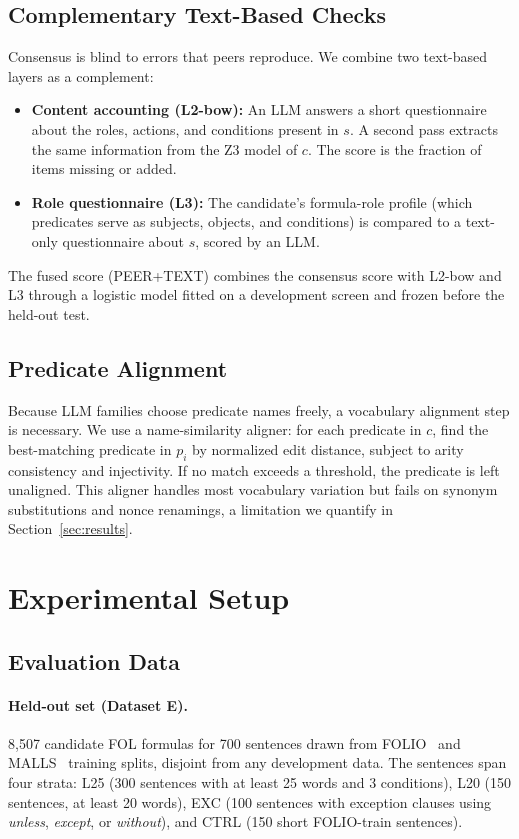 \documentclass[11pt,letterpaper]{article}
\begin{document}
\subsection{Complementary Text-Based Checks}

Consensus is blind to errors that peers reproduce. We combine two text-based layers as a complement:

\begin{itemize}
  \item \textbf{Content accounting (L2-bow):} An LLM answers a short questionnaire about the roles, actions, and conditions present in $s$. A second pass extracts the same information from the Z3 model of $c$. The score is the fraction of items missing or added.
  \item \textbf{Role questionnaire (L3):} The candidate's formula-role profile (which predicates serve as subjects, objects, and conditions) is compared to a text-only questionnaire about $s$, scored by an LLM.
\end{itemize}

The fused score (PEER+TEXT) combines the consensus score with L2-bow and L3 through a logistic model fitted on a development screen and frozen before the held-out test.

\subsection{Predicate Alignment}

Because LLM families choose predicate names freely, a vocabulary alignment step is necessary. We use a name-similarity aligner: for each predicate in $c$, find the best-matching predicate in $p_i$ by normalized edit distance, subject to arity consistency and injectivity. If no match exceeds a threshold, the predicate is left unaligned. This aligner handles most vocabulary variation but fails on synonym substitutions and nonce renamings, a limitation we quantify in Section~\ref{sec:results}.


\section{Experimental Setup}
\label{sec:setup}

\subsection{Evaluation Data}

\paragraph{Held-out set (Dataset E).}
8,507 candidate FOL formulas for 700 sentences drawn from FOLIO~\citep{Han2022} and MALLS~\citep{Yang2023} training splits, disjoint from any development data. The sentences span four strata: L25 (300 sentences with at least 25 words and 3 conditions), L20 (150 sentences, at least 20 words), EXC (100 sentences with exception clauses using \emph{unless}, \emph{except}, or \emph{without}), and CTRL (150 short FOLIO-train sentences).
\end{document}
